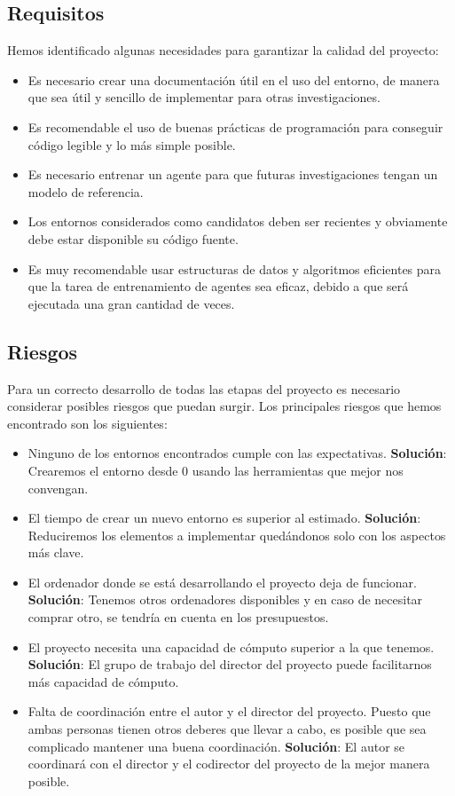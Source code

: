  \subsection{Requisitos}

Hemos identificado algunas necesidades para garantizar la calidad del proyecto:
\begin{itemize}
    \item Es necesario crear una documentación útil en el uso del entorno, de manera que sea útil y sencillo de implementar para otras investigaciones.
    \item Es recomendable el uso de buenas prácticas de programación para conseguir código legible y lo más simple posible. 
    \item Es necesario entrenar un agente para que futuras investigaciones tengan un modelo de referencia.
    \item Los entornos considerados como candidatos deben ser recientes y obviamente debe estar disponible su código fuente. 
    \item Es muy recomendable usar estructuras de datos y algoritmos eficientes para que la tarea de entrenamiento de agentes sea eficaz, debido a que será ejecutada una gran cantidad de veces.
\end{itemize}


\subsection{Riesgos}
Para un correcto desarrollo de todas las etapas del proyecto es necesario considerar posibles riesgos que puedan surgir. Los principales riesgos que hemos encontrado son los siguientes:
\begin{itemize}
    \item Ninguno de los entornos encontrados cumple con las expectativas. \textbf{Solución}: Crearemos el entorno desde 0 usando las herramientas que mejor nos convengan.
    \item El tiempo de crear un nuevo entorno es superior al estimado. \textbf{Solución}: Reduciremos los elementos a implementar quedándonos solo con los aspectos más clave.
    \item El ordenador donde se está desarrollando el proyecto deja de funcionar. \textbf{Solución}: Tenemos otros ordenadores disponibles y en caso de necesitar comprar otro, se tendría en cuenta en los presupuestos. 
    \item El proyecto necesita una capacidad de cómputo superior a la que tenemos. \textbf{Solución}: El grupo de trabajo del director del proyecto puede facilitarnos más capacidad de cómputo.
    \item Falta de coordinación entre el autor y el director del proyecto. Puesto que ambas personas tienen otros deberes que llevar a cabo, es posible que sea complicado mantener una buena coordinación. \textbf{Solución}: El autor se coordinará con el director y el codirector del proyecto de la mejor manera posible. 
\end{itemize}
    